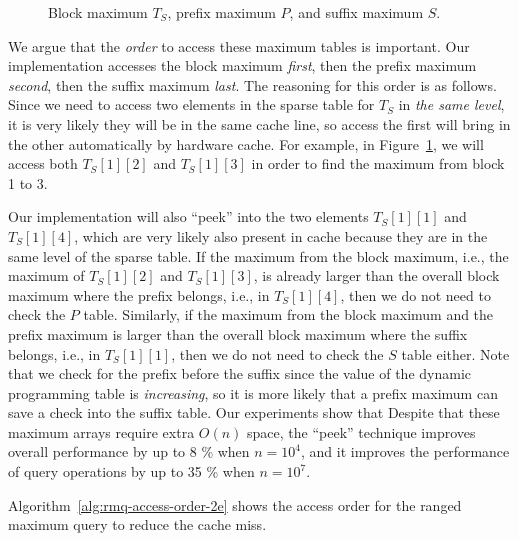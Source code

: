 

\begin{figure}[!thb]
  \centering {}  \caption{Block maximum $T_S$, prefix maximum $P$, and suffix
    maximum $S$.}
  \label{fig:compressed-sp-opt}
\end{figure}

We argue that the {\em order} to access these maximum tables is
important.  Our implementation accesses the block maximum {\em first},
then the prefix maximum {\em second}, then the suffix maximum {\em
last}.  The reasoning for this order is as follows.  Since we need to
access two elements in the sparse table for $T_S$ in {\em the same
level}, it is very likely they will be in the same cache line, so access
the first will bring in the other automatically by hardware cache.  For
example, in Figure~\ref{fig:compressed-sp-opt}, we will access both
$T_{S}[1][2]$ and $T_{S}[1][3]$ in order to find the maximum from block
1 to 3.

Our implementation will also ``peek'' into the two elements
$T_{S}[1][1]$ and $T_{S}[1][4]$, which are very likely also present in
cache because they are in the same level of the sparse table. If the
maximum from the block maximum, i.e., the maximum of $T_{S}[1][2]$ and
$T_{S}[1][3]$, is already larger than the overall block maximum where
the prefix belongs, i.e., in $T_{S}[1][4]$, then we do not need to check
the $P$ table.  Similarly, if the maximum from the block maximum and
the prefix maximum is larger than the overall block maximum where the
suffix belongs, i.e., in $T_{S}[1][1]$, then we do not need to check the
$S$ table either. Note that we check for the prefix before the suffix
since the value of the dynamic programming table is {\em increasing}, so
it is more likely that a prefix maximum can save a check into the suffix
table. Our experiments show that Despite that these maximum arrays
require extra $O(n)$ space, the ``peek'' technique improves overall
performance by up to 8 \% when $n = 10^4$, and it improves the
performance of query operations by up to 35 \% when $n = 10^7$.

Algorithm~\ref{alg:rmq-access-order-2e} shows the access order for the
ranged maximum query to reduce the cache miss.  




